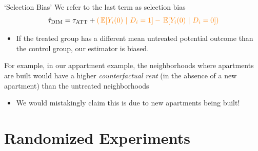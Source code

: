 \documentclass[aspectratio=169,t,11pt,table]{beamer}
\begin{document}
\begin{frame}{`Selection Bias'}
  We refer to the last term as {\color{orange} selection bias}
  $$
    \hat{\tau}_{\text{DIM}} = \tau_{\text{ATT}} + {\color{orange} \left( \expec{Y_{i}(0)}{D_i = 1} - \expec{Y_{i}(0)}{D_i = 0} \right) }
  $$

  \begin{itemize}
    \item If the treated group has a different mean untreated potential outcome than the control group, our estimator is biased.
  \end{itemize}

  \pause
  \bigskip
  For example, in our appartment example, the neighborhoods where apartments are built would have a higher \emph{counterfactual rent} (in the absence of a new apartment) than the untreated neighborhoods
  \begin{itemize}
    \item We would mistakingly claim this is due to new apartments being built!
  \end{itemize}
\end{frame}


\section{Randomized Experiments}
\end{document}
